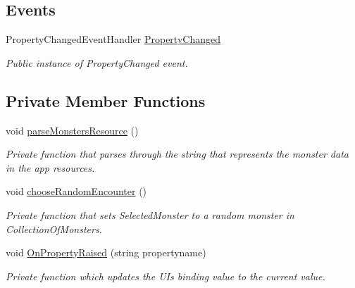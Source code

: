\subsection*{Events}
\begin{DoxyCompactItemize}
\item 
Property\+Changed\+Event\+Handler \mbox{\hyperlink{class_dungeons__n___dragons___manager_1_1_viewmodels_1_1_encounters_tab_viewmodel_ae504409bb84e7a61e1aa653f08f01ca4}{Property\+Changed}}
\begin{DoxyCompactList}\small\item\em Public instance of Property\+Changed event. \end{DoxyCompactList}\end{DoxyCompactItemize}
\subsection*{Private Member Functions}
\begin{DoxyCompactItemize}
\item 
void \mbox{\hyperlink{class_dungeons__n___dragons___manager_1_1_viewmodels_1_1_encounters_tab_viewmodel_ac7ac82b681a22001bb3c73282726f7eb}{parse\+Monsters\+Resource}} ()
\begin{DoxyCompactList}\small\item\em Private function that parses through the string that represents the monster data in the app resources. \end{DoxyCompactList}\item 
void \mbox{\hyperlink{class_dungeons__n___dragons___manager_1_1_viewmodels_1_1_encounters_tab_viewmodel_a31ea129f6b42be81bbe4d002b24f0c9d}{choose\+Random\+Encounter}} ()
\begin{DoxyCompactList}\small\item\em Private function that sets Selected\+Monster to a random monster in Collection\+Of\+Monsters. \end{DoxyCompactList}\item 
void \mbox{\hyperlink{class_dungeons__n___dragons___manager_1_1_viewmodels_1_1_encounters_tab_viewmodel_acc4dd33d616b343c011019bcb26ddcec}{On\+Property\+Raised}} (string propertyname)
\begin{DoxyCompactList}\small\item\em Private function which updates the UI\textquotesingle{}s binding value to the current value. \end{DoxyCompactList}\end{DoxyCompactItemize}
